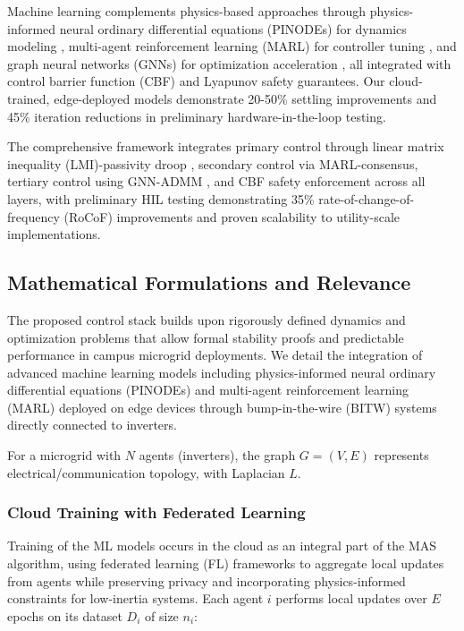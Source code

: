 \documentclass[12pt]{article}
\begin{document}
Machine learning complements physics-based approaches through physics-informed neural ordinary differential equations (PINODEs) for dynamics modeling \cite{zhang2022}, multi-agent reinforcement learning (MARL) for controller tuning \cite{zhou2021}, and graph neural networks (GNNs) for optimization acceleration \cite{chen2020}, all integrated with control barrier function (CBF) \cite{ames2017} and Lyapunov safety guarantees. Our cloud-trained, edge-deployed models demonstrate 20-50\% settling improvements and 45\% iteration reductions in preliminary hardware-in-the-loop testing.

The comprehensive framework integrates primary control through linear matrix inequality (LMI)-passivity droop \cite{guerrero2013}, secondary control via MARL-consensus, tertiary control using GNN-ADMM \cite{simpson2020}, and CBF safety enforcement across all layers, with preliminary HIL testing demonstrating 35\% rate-of-change-of-frequency (RoCoF) improvements and proven scalability to utility-scale implementations.

\subsection{Mathematical Formulations and Relevance}

The proposed control stack builds upon rigorously defined dynamics and optimization problems that allow formal stability proofs and predictable performance in campus microgrid deployments. We detail the integration of advanced machine learning models including physics-informed neural ordinary differential equations (PINODEs) and multi-agent reinforcement learning (MARL) deployed on edge devices through bump-in-the-wire (BITW) systems directly connected to inverters.

For a microgrid with $N$ agents (inverters), the graph $G = (V, E)$ represents electrical/communication topology, with Laplacian $L$.

\subsubsection{Cloud Training with Federated Learning}

Training of the ML models occurs in the cloud as an integral part of the MAS algorithm, using federated learning (FL) frameworks to aggregate local updates from agents while preserving privacy and incorporating physics-informed constraints for low-inertia systems. Each agent $i$ performs local updates over $E$ epochs on its dataset $D_i$ of size $n_i$:
\end{document}
